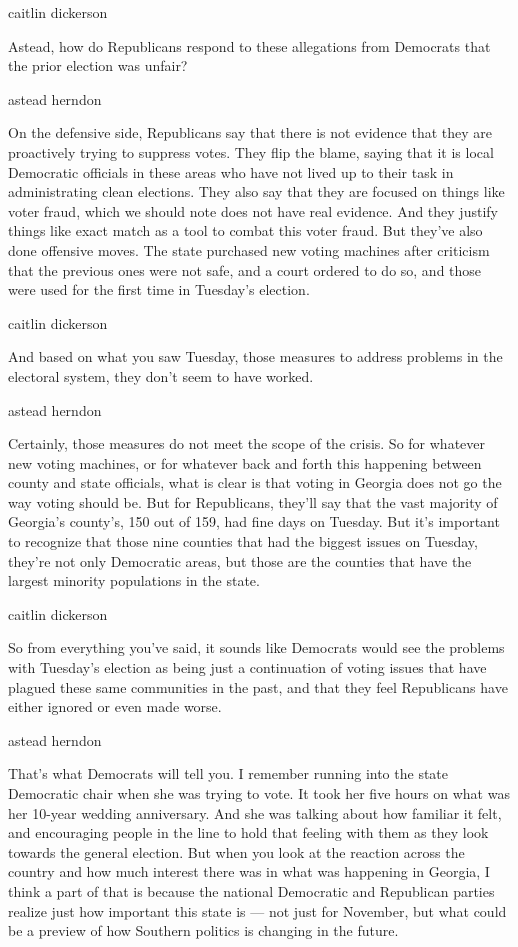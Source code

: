 caitlin dickerson

Astead, how do Republicans respond to these allegations from Democrats
that the prior election was unfair?

astead herndon

On the defensive side, Republicans say that there is not evidence that
they are proactively trying to suppress votes. They flip the blame,
saying that it is local Democratic officials in these areas who have not
lived up to their task in administrating clean elections. They also say
that they are focused on things like voter fraud, which we should note
does not have real evidence. And they justify things like exact match as
a tool to combat this voter fraud. But they've also done offensive
moves. The state purchased new voting machines after criticism that the
previous ones were not safe, and a court ordered to do so, and those
were used for the first time in Tuesday's election.

caitlin dickerson

And based on what you saw Tuesday, those measures to address problems in
the electoral system, they don't seem to have worked.

astead herndon

Certainly, those measures do not meet the scope of the crisis. So for
whatever new voting machines, or for whatever back and forth this
happening between county and state officials, what is clear is that
voting in Georgia does not go the way voting should be. But for
Republicans, they'll say that the vast majority of Georgia's county's,
150 out of 159, had fine days on Tuesday. But it's important to
recognize that those nine counties that had the biggest issues on
Tuesday, they're not only Democratic areas, but those are the counties
that have the largest minority populations in the state.

caitlin dickerson

So from everything you've said, it sounds like Democrats would see the
problems with Tuesday's election as being just a continuation of voting
issues that have plagued these same communities in the past, and that
they feel Republicans have either ignored or even made worse.

astead herndon

That's what Democrats will tell you. I remember running into the state
Democratic chair when she was trying to vote. It took her five hours on
what was her 10-year wedding anniversary. And she was talking about how
familiar it felt, and encouraging people in the line to hold that
feeling with them as they look towards the general election. But when
you look at the reaction across the country and how much interest there
was in what was happening in Georgia, I think a part of that is because
the national Democratic and Republican parties realize just how
important this state is --- not just for November, but what could be a
preview of how Southern politics is changing in the future.

